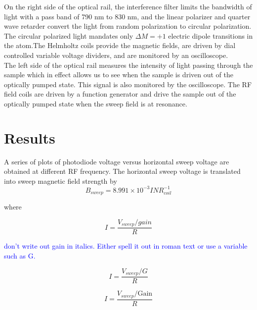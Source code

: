 \documentclass[prb,preprint]{revtex4-1}
\begin{document}
On the right side of the optical rail, the interference filter limits the bandwidth of light with a pass band of 790 nm to 830 nm, and the linear polarizer and quarter wave retarder convert the light from random polarization to circular polarization. The circular polarized light mandates only $\Delta M=+1$ electric dipole transitions in the atom.The Helmholtz coils provide the magnetic fields, are driven by dial controlled variable voltage dividers, and are monitored by an oscilloscope.\\

The left side of the optical rail measures the intensity of light passing through the sample which in effect allows us to see when the sample is driven out of the optically pumped state. This signal is also monitored by the oscilloscope. The RF field coils are driven by a function generator and drive the sample out of the optically pumped state when the sweep field is at resonance.\\




\section{Results}

A series of plots of photodiode voltage versus horizontal sweep voltage are obtained at different RF frequency. The horizontal sweep voltage is translated into sweep magnetic field strength by
\begin{equation}
B_{sweep}=8.991\times10^{-3} I N R_{coil}^{-1}
\label{vtob}
\end{equation}

where

\begin{equation}
I=\frac{V_{sweep}/gain}{R}
\label{vtoi}
\end{equation}

\textcolor{blue}{don't write out gain in italics. Either spell it out in roman text or use a variable such as G.} 



\begin{equation*}
I=\frac{V_{sweep}/G}{R}
\label{vtoi}
\end{equation*}

\begin{equation*}
I=\frac{V_{sweep}/{\textrm{Gain}}}{R}
\label{vtoi}
\end{equation*}
\end{document}
